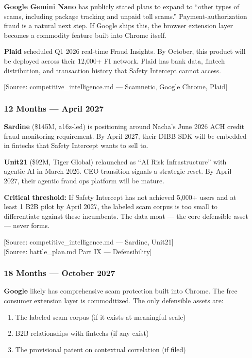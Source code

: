 \documentclass[11pt, letterpaper]{article}
\newcommand{\source}[1]{\textcolor{citation}{[Source: #1]}}
\begin{document}
  \textbf{Google Gemini Nano} has publicly stated plans to expand to ``other types of scams, including package tracking and unpaid toll scams.'' Payment-authorization fraud is a natural next step. If Google ships this, the browser extension layer becomes a commodity feature built into Chrome itself.

  \textbf{Plaid} scheduled Q1 2026 real-time Fraud Insights. By October, this product will be deployed across their 12,000+ FI network. Plaid has bank data, fintech distribution, and transaction history that Safety Intercept cannot access.

  \source{competitive\_intelligence.md --- Scamnetic, Google Chrome, Plaid}

  \subsubsection{12 Months --- April 2027}

  \textbf{Sardine} (\$145M, a16z-led) is positioning around Nacha's June 2026 ACH credit fraud monitoring requirement. By April 2027, their DIBB SDK will be embedded in fintechs that Safety Intercept wants to sell to.

  \textbf{Unit21} (\$92M, Tiger Global) relaunched as ``AI Risk Infrastructure'' with agentic AI in March 2026. CEO transition signals a strategic reset. By April 2027, their agentic fraud ops platform will be mature.

  \textbf{Critical threshold:} If Safety Intercept has not achieved 5,000+ users and at least 1 B2B pilot by April 2027, the labeled scam corpus is too small to differentiate against these incumbents. The data moat --- the core defensible asset --- never forms.

  \source{competitive\_intelligence.md --- Sardine, Unit21}\\
  \source{battle\_plan.md Part IX --- Defensibility}

  \subsubsection{18 Months --- October 2027}

  \textbf{Google} likely has comprehensive scam protection built into Chrome. The free consumer extension layer is commoditized. The only defensible assets are:
  \begin{enumerate}[nosep]
    \item The labeled scam corpus (if it exists at meaningful scale)
    \item B2B relationships with fintechs (if any exist)
    \item The provisional patent on contextual correlation (if filed)
  \end{enumerate}
\end{document}
